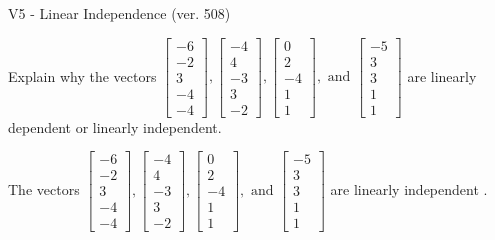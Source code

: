\begin{exercise}
  \begin{exerciseTitle}V5 - Linear Independence (ver. 508)\end{exerciseTitle}
  \begin{exerciseStatement}
    Explain why the vectors \(\left[\begin{array}{r}
-6 \\
-2 \\
3 \\
-4 \\
-4
\end{array}\right] , \left[\begin{array}{r}
-4 \\
4 \\
-3 \\
3 \\
-2
\end{array}\right] , \left[\begin{array}{r}
0 \\
2 \\
-4 \\
1 \\
1
\end{array}\right] , \text{ and } \left[\begin{array}{r}
-5 \\
3 \\
3 \\
1 \\
1
\end{array}\right]\) are linearly dependent or linearly independent.	


  \end{exerciseStatement}
  \begin{exerciseAnswer}
   The vectors \(\left[\begin{array}{r}
-6 \\
-2 \\
3 \\
-4 \\
-4
\end{array}\right] , \left[\begin{array}{r}
-4 \\
4 \\
-3 \\
3 \\
-2
\end{array}\right] , \left[\begin{array}{r}
0 \\
2 \\
-4 \\
1 \\
1
\end{array}\right] , \text{ and } \left[\begin{array}{r}
-5 \\
3 \\
3 \\
1 \\
1
\end{array}\right]\) are 
  	 linearly independent  .
  


  \end{exerciseAnswer}
\end{exercise}